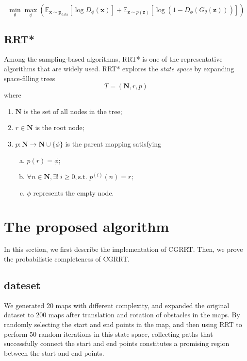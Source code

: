 \documentclass[smallcondensed]{svjour3}     %
\begin{document}
\begin{equation}\label{equation: objective funtion-gan}
	\min_{\theta} \max_{\phi} ( \mathbb{E}_{\mathbf{x} \sim \textbf{p}_{\textrm{data}}}[\log D_\phi(\textbf{x})] + 
	\mathbb{E}_{\mathbf{z} \sim p(\textbf{z})}[\log (1-D_\phi(G_\theta(\textbf{z})))] )
\end{equation}




\subsection{RRT*}\label{subsection: rrt-star}
Among the sampling-based algorithms, RRT* is one of the representative algorithms that are widely used.
RRT* explores the \emph{state space} by expanding space-filling trees
\begin{equation}\label{equation: space-filling trees}
	T = (\mathbf{N}, r, p)
\end{equation}
where
\begin{enumerate}[1)]
	\item $\mathbf{N}$ is the set of all nodes in the tree;
	\item $r \in \mathbf{N}$ is the root node;
	\item $p: \mathbf{N} \to \mathbf{N} \cup \{\phi\}$ is the parent mapping satisfying
	\begin{enumerate}[a)]
		\item $p(r) = \phi$;
		\item $\forall n \in \mathbf{N}, \exists ! \ i \geq 0, \textrm{s.t. } p^{(i)}(n) =r$;
		\item $\phi$ represents the empty node.
	\end{enumerate}
\end{enumerate}

\section{The proposed algorithm}
In this section, we first describe the implementation of CGRRT.
Then, we prove the probabilistic completeness of CGRRT.

\subsection{dateset}
We generated 20 maps with different complexity, and expanded the original dataset to 200 maps after translation and rotation of obstacles in the maps. 
By randomly selecting the start and end points in the map, and then using RRT to perform 50 random iterations in this state space, collecting paths that successfully connect the start and end points constitutes a promising region between the start and end points.
\end{document}
